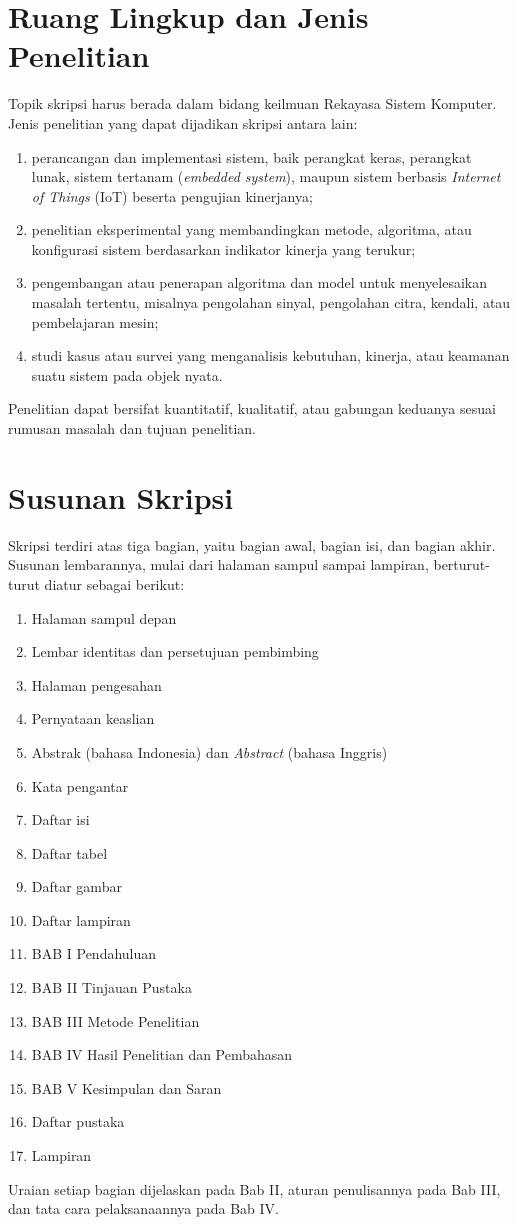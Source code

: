 \section{Ruang Lingkup dan Jenis Penelitian}
Topik skripsi harus berada dalam bidang keilmuan Rekayasa Sistem Komputer. Jenis penelitian yang dapat dijadikan skripsi antara lain:
\begin{enumerate}
\item perancangan dan implementasi sistem, baik perangkat keras, perangkat lunak, sistem tertanam (\textit{embedded system}), maupun sistem berbasis \textit{Internet of Things} (IoT) beserta pengujian kinerjanya;
\item penelitian eksperimental yang membandingkan metode, algoritma, atau konfigurasi sistem berdasarkan indikator kinerja yang terukur;
\item pengembangan atau penerapan algoritma dan model untuk menyelesaikan masalah tertentu, misalnya pengolahan sinyal, pengolahan citra, kendali, atau pembelajaran mesin;
\item studi kasus atau survei yang menganalisis kebutuhan, kinerja, atau keamanan suatu sistem pada objek nyata.
\end{enumerate}
Penelitian dapat bersifat kuantitatif, kualitatif, atau gabungan keduanya sesuai rumusan masalah dan tujuan penelitian.

\section{Susunan Skripsi}
Skripsi terdiri atas tiga bagian, yaitu bagian awal, bagian isi, dan bagian akhir. Susunan lembarannya, mulai dari halaman sampul sampai lampiran, berturut-turut diatur sebagai berikut:
\begin{enumerate}
\item Halaman sampul depan
\item Lembar identitas dan persetujuan pembimbing
\item Halaman pengesahan
\item Pernyataan keaslian
\item Abstrak (bahasa Indonesia) dan \textit{Abstract} (bahasa Inggris)
\item Kata pengantar
\item Daftar isi
\item Daftar tabel
\item Daftar gambar
\item Daftar lampiran
\item BAB I Pendahuluan
\item BAB II Tinjauan Pustaka
\item BAB III Metode Penelitian
\item BAB IV Hasil Penelitian dan Pembahasan
\item BAB V Kesimpulan dan Saran
\item Daftar pustaka
\item Lampiran
\end{enumerate}
Uraian setiap bagian dijelaskan pada Bab II, aturan penulisannya pada Bab III, dan tata cara pelaksanaannya pada Bab IV.

